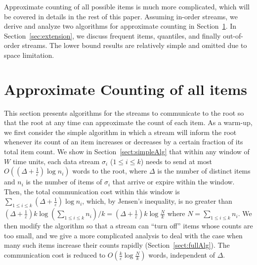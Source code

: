 \documentclass[proceedings]{stacs}
\theoremstyle{definition}\newtheorem{fact}{Fact}
\begin{document}
Approximate counting of all possible items is much more complicated,
which will be covered in details in the rest of this paper.
Assuming in-order streams, we derive and analyze two algorithms
 for approximate counting in Section~\ref{sec:fi}.
In Section~\ref{sec:extension}, we discuss frequent items, quantiles, and
finally out-of-order streams.
The lower bound results are relatively simple and omitted due to space limitation.












\section{Approximate Counting of all items}
\label{sec:fi}
This section presents algorithms for the streams to communicate to the root
so that the root at any time can approximate
the count of each item.
As a warm-up, we first consider the simple algorithm
in which a stream will inform the root
whenever its count of an item increases or decreases
by a certain fraction of its total item count.
  {We show
in Section~\ref{sect:simpleAlg} that within any window of $W$ time units,
each data stream $\sigma_i$ ($1 \leq i \leq k$) needs to send at most
$O((\Delta + \frac{1}{\varepsilon}) \log n_i)$ words to the
root, where $\Delta$ is the number of distinct items and $n_i$
is the number of items of $\sigma_i$ that arrive or expire within the
window.
Then, the total communication cost within this window is $\sum_{1 \leq
  i \leq k} (\Delta + \frac{1}{\varepsilon})\log n_i$, which, by
Jensen's inequality, is no greater than $(\Delta +
\frac{1}{\varepsilon})k \log (\sum_{1 \leq i \leq k} n_i)/k =
(\Delta + \frac{1}{\varepsilon})k \log \frac{N}{k}$
where $N = \sum_{1 \leq i \leq k}n_i$.}
We then modify the algorithm so that
a stream can ``turn off'' items whose counts are too small,
and we give a more complicated analysis
to deal with the case when many such items increase their counts rapidly
(Section~\ref{sect:fullAlg}).
The communication cost is reduced to $O(\frac{k}{\varepsilon} \log
\frac{N}{k})$ words,  {independent of $\Delta$.}
\end{document}
